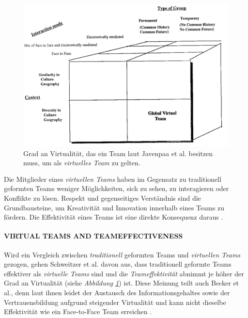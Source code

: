 \documentclass[sigchi]{acmart}
\begin{document}
\begin{figure}[H]
		\begin{footnotesize}
		\centering
			\includegraphics[width=\linewidth]{Abbildungen/GlobalVirtualTeam.PNG}	
			\caption[Virtualität eines virtuellen Teams]{Grad an Virtualität, das ein Team laut Javenpaa et al. \citep{jarvenpaa1999communication} besitzen muss, um als \textit{virtuelles Team} zu gelten.}
			\label{virtualTeamsVirtuality}
		\end{footnotesize}
	\end{figure}

Die Mitglieder eines \textit{virtuellen Teams} haben im Gegensatz zu traditionell geformten Teams weniger Möglichkeiten, sich zu sehen, zu interagieren oder Konflikte zu lösen. 
Respekt und gegenseitiges Verständnis sind die Grundbausteine, um Kreativität und Innovation innerhalb eines Teams zu fördern. Die Effektivität eines Teams ist eine direkte Konsequenz daraus \citep[S. 378]{ren2007applying}.

\paragraph{VIRTUAL TEAMS AND TEAMEFFECTIVENESS}

Wird ein Vergleich zwischen \textit{traditionell} geformten Teams und \textit{virtuellen Teams} gezogen, gehen Schweitzer et al. \citep{schweitzer2010conceptualizing} davon aus, dass traditionell geformte Teams effektiver als \textit{virtuelle Teams} sind und die \textit{Teameffektivität} abnimmt je höher der Grad an Virtualität (siehe \textit{Abbildung \ref{virtualTeamsVirtuality}}) ist.
Diese Meinung teilt auch Becker et al., denn laut ihnen leidet der Austausch des Informationsgehaltes sowie der Vertrauensbildung aufgrund steigender Virtualität und kann nicht dieselbe Effektivität wie ein Face-to-Face Team erreichen \citep{becker2002fuhrung}.
\end{document}
